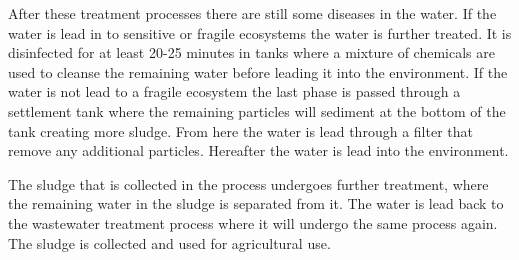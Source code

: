 After these treatment processes there are still some diseases in the water. If the water is lead in to sensitive or fragile ecosystems the water is further treated. It is disinfected for at least 20-25 minutes in tanks where a mixture of chemicals are used to cleanse the remaining water before leading it into the environment. If the water is not lead to a fragile ecosystem the last phase is passed through a settlement tank where the remaining particles will sediment at the bottom of the tank creating more sludge. From here the water is lead through a filter that remove any additional particles. Hereafter the water is lead into the environment. 

The sludge that is collected in the process undergoes further treatment, where the remaining water in the sludge is separated from it. The water is lead back to the wastewater treatment process where it will undergo the same process again. The sludge is collected and used for agricultural use.





